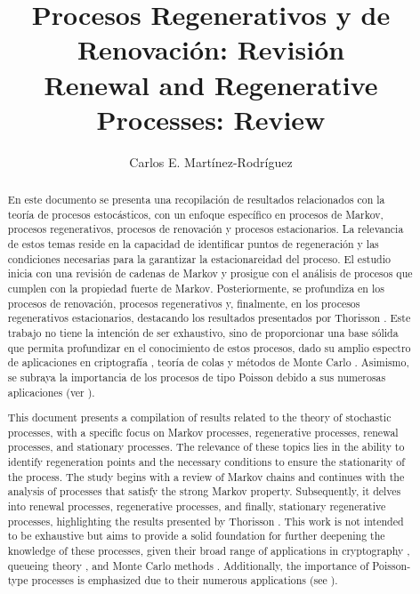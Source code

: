 \documentclass{article}
\title{Procesos Regenerativos y de Renovación: Revisión\\
\small{Renewal and Regenerative Processes: Review}}
\author{Carlos E. Martínez-Rodríguez}
\date{}
\renewcommand{\abstractname}{Resumen}
\numberwithin{equation}{section}
\newcommand{\acmclass}[1]{\noindent\textbf{ACM Class:} #1\\}
\newcommand{\mscclass}[1]{\noindent\textbf{MSC Class:} #1\\}
\begin{document}
\maketitle

\begin{abstract}
En este documento se presenta una recopilación de resultados relacionados con la teoría de procesos estocásticos, con un enfoque específico en procesos de Markov, procesos regenerativos, procesos de renovación y procesos estacionarios. La relevancia de estos temas reside en la capacidad de identificar puntos de regeneración y las condiciones necesarias para la garantizar la estacionareidad del proceso. El estudio inicia con una revisión de cadenas de Markov y prosigue con el análisis de procesos que cumplen con la propiedad fuerte de Markov. Posteriormente, se profundiza en los procesos de renovación, procesos regenerativos y, finalmente, en los procesos regenerativos estacionarios, destacando los resultados presentados por Thorisson \cite{Thorisson}. Este trabajo no tiene la intención de ser exhaustivo, sino de proporcionar una base sólida que permita profundizar en el conocimiento de estos procesos, dado su amplio espectro de aplicaciones en criptografía \cite{Portman}, teoría de colas \cite{Morozov} y métodos de Monte Carlo \cite{Xu}. Asimismo, se subraya la importancia de los procesos de tipo Poisson debido a sus numerosas aplicaciones (ver \cite{Douc}).
\end{abstract}

\begin{otherlanguage}{english}
\renewcommand{\abstractname}{Abstract} %
\begin{abstract}
This document presents a compilation of results related to the theory of stochastic processes, with a specific focus on Markov processes, regenerative processes, renewal processes, and stationary processes. The relevance of these topics lies in the ability to identify regeneration points and the necessary conditions to ensure the stationarity of the process. The study begins with a review of Markov chains and continues with the analysis of processes that satisfy the strong Markov property. Subsequently, it delves into renewal processes, regenerative processes, and finally, stationary regenerative processes, highlighting the results presented by Thorisson \cite{Thorisson}. This work is not intended to be exhaustive but aims to provide a solid foundation for further deepening the knowledge of these processes, given their broad range of applications in cryptography \cite{Portman}, queueing theory \cite{Morozov}, and Monte Carlo methods \cite{Xu}. Additionally, the importance of Poisson-type processes is emphasized due to their numerous applications (see \cite{Douc}).
\end{abstract}
\end{otherlanguage}
\end{document}
